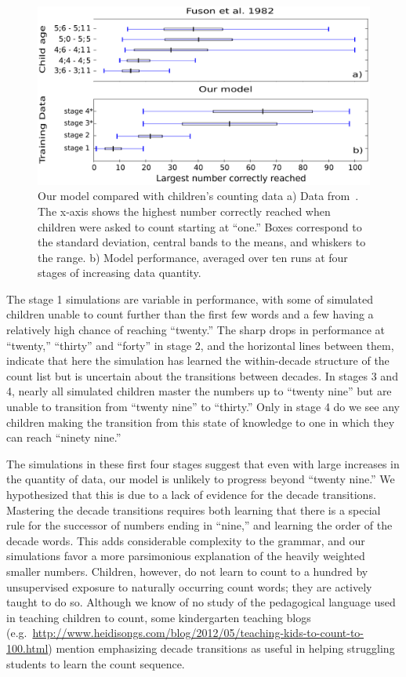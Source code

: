 \documentclass[10pt,letterpaper]{article}
\begin{document}
\begin{figure}[t]
  \includegraphics[width=0.9\linewidth]{figures/modelboxplot.pdf}
  \caption{Our model compared with children's counting data a) Data
    from~\citet{FusRicBriar1982}. The x-axis shows the highest number
    correctly reached when children were asked to count starting at
    ``one.'' Boxes correspond to the standard deviation, central bands
    to the means, and whiskers to the range. b) Model performance,
    averaged over ten runs at four stages of increasing data
    quantity.}\label{fig:fuson_model_comparison}
\end{figure}

The stage 1 simulations are variable in performance, with some of
simulated children unable to count further than the first few words
and a few having a relatively high chance of reaching ``twenty.'' The
sharp drops in performance at ``twenty,'' ``thirty'' and ``forty'' in
stage 2, and the horizontal lines between them, indicate that here the
simulation has learned the within-decade structure of the count list
but is uncertain about the transitions between decades. In stages 3
and 4, nearly all simulated children master the numbers up to ``twenty
nine'' but are unable to transition from ``twenty nine'' to ``thirty.''
Only in stage 4 do we see any children making the transition from this
state of knowledge to one in which they can reach ``ninety nine.''

The simulations in these first four stages suggest that even with
large increases in the quantity of data, our model is unlikely to
progress beyond ``twenty nine.'' We hypothesized that this is due to a
lack of evidence for the decade transitions. Mastering the decade
transitions requires both learning that there is a special rule for
the successor of numbers ending in ``nine,'' and learning the order of
the decade words. This adds considerable complexity to the grammar,
and our simulations favor a more parsimonious explanation of the
heavily weighted smaller numbers. Children, however, do not learn to
count to a hundred by unsupervised exposure to naturally occurring
count words; they are actively taught to do so. Although we know of no
study of the pedagogical language used in teaching children to count,
some kindergarten teaching blogs (e.g.~\url{http://www.heidisongs.com/blog/2012/05/teaching-kids-to-count-to-100.html})
mention emphasizing decade transitions as useful in helping struggling
students to learn the count sequence.
\end{document}
